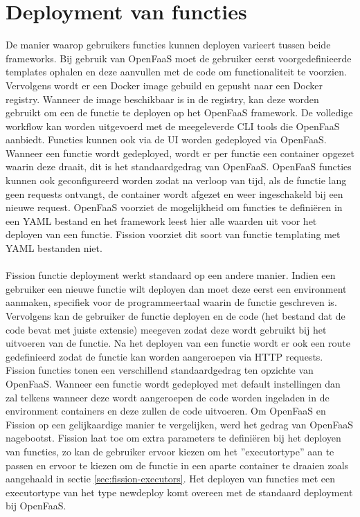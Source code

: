 \section{Deployment van functies}
De manier waarop gebruikers functies kunnen deployen varieert tussen beide frameworks. Bij gebruik van OpenFaaS moet de gebruiker eerst voorgedefinieerde templates ophalen en deze aanvullen met de code om functionaliteit te voorzien. Vervolgens wordt er een Docker image gebuild en gepusht naar een Docker registry. Wanneer de image beschikbaar is in de registry, kan deze worden gebruikt om een de functie te deployen op het OpenFaaS framework. De volledige workflow kan worden uitgevoerd met de meegeleverde CLI tools die OpenFaaS aanbiedt. Functies kunnen ook via de UI worden gedeployed via OpenFaaS. Wanneer een functie wordt gedeployed, wordt er per functie een container opgezet waarin deze draait, dit is het standaardgedrag van OpenFaaS. OpenFaaS functies kunnen ook geconfigureerd worden zodat na verloop van tijd, als de functie lang geen requests ontvangt, de container wordt afgezet en weer ingeschakeld bij een nieuwe request. OpenFaaS voorziet de mogelijkheid om functies te definiëren in een YAML bestand en het framework leest hier alle waarden uit voor het deployen van een functie. Fission voorziet dit soort van functie templating met YAML bestanden niet.
\\\\
Fission functie deployment werkt standaard op een andere manier. Indien een gebruiker een nieuwe functie wilt deployen dan moet deze eerst een environment aanmaken, specifiek voor de programmeertaal waarin de functie geschreven is. Vervolgens kan de gebruiker de functie deployen en de code (het bestand dat de code bevat met juiste extensie) meegeven zodat deze wordt gebruikt bij het uitvoeren van de functie. Na het deployen van een functie wordt er ook een route gedefinieerd zodat de functie kan worden aangeroepen via HTTP requests. Fission functies tonen een verschillend standaardgedrag ten opzichte van OpenFaaS. Wanneer een functie wordt gedeployed met default instellingen dan zal telkens wanneer deze wordt aangeroepen de code worden ingeladen in de environment containers en deze zullen de code uitvoeren. Om OpenFaaS en Fission op een gelijkaardige manier te vergelijken, werd het gedrag van OpenFaaS nagebootst. Fission laat toe om extra parameters te definiëren bij het deployen van functies, zo kan de gebruiker ervoor kiezen om het ''executortype'' aan te passen en ervoor te kiezen om de functie in een aparte container te draaien zoals aangehaald in sectie \ref{sec:fission-executors}. Het deployen van functies met een executortype van het type newdeploy komt overeen met de standaard deployment bij OpenFaaS.
